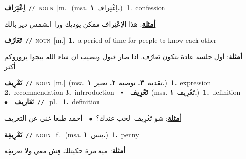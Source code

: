 \documentclass[10pt,a4paper,twoside]{article} %
\begin{document}
\begin{multicols}{2}
{\setlength\topsep{0pt}\textbf{\foreignlanguage{arabic}{اِعْتِرَاف}}\ {\color{gray}\texttt{//}\color{black}}\ \textsc{noun}\ [m.]\ \color{gray}(msa. \foreignlanguage{arabic}{اِعْتِراف}~\foreignlanguage{arabic}{\textbf{١.}})\color{black}\ \textbf{1.}~confession\  \begin{flushright}\color{gray}\foreignlanguage{arabic}{\textbf{\underline{\foreignlanguage{arabic}{أمثلة}}}: هذا الاِعْتِراف ممكن يوديك ورا الشمس دير بالك}\end{flushright}\color{black}} \vspace{2mm}

{\setlength\topsep{0pt}\textbf{\foreignlanguage{arabic}{تَعَارُف}}\ {\color{gray}\texttt{//}\color{black}}\ \textsc{noun}\ [m.]\ \textbf{1.}~a period of time for people to know each other\  \begin{flushright}\color{gray}\foreignlanguage{arabic}{\textbf{\underline{\foreignlanguage{arabic}{أمثلة}}}: أول جلسة عادة بتكون تَعارُف. اذا صار قبول ونصيب ان شاء الله بيجوا يزوروكم أكثر}\end{flushright}\color{black}} \vspace{2mm}

{\setlength\topsep{0pt}\textbf{\foreignlanguage{arabic}{تَعْرِيف}}\ {\color{gray}\texttt{//}\color{black}}\ \textsc{noun}\ [m.]\ \color{gray}(msa. \foreignlanguage{arabic}{تقديم}~\foreignlanguage{arabic}{\textbf{٣.}}  \foreignlanguage{arabic}{توصية}~\foreignlanguage{arabic}{\textbf{٢.}}  \foreignlanguage{arabic}{تعبير}~\foreignlanguage{arabic}{\textbf{١.}})\color{black}\ \textbf{1.}~expression  \textbf{2.}~recommendation  \textbf{3.}~intrroduction\ \ $\smblkdiamond$\ \ \setlength\topsep{0pt}\textbf{\foreignlanguage{arabic}{تَعْرِيف}}\ \color{gray}(msa. \foreignlanguage{arabic}{تَعْرِيف}~\foreignlanguage{arabic}{\textbf{١.}})\color{black}\ \textbf{1.}~definition\ \ $\bullet$\ \ \setlength\topsep{0pt}\textbf{\foreignlanguage{arabic}{تَعَارِيف}}\ {\color{gray}\texttt{//}\color{black}}\ [pl.]\ \textbf{1.}~definition\  \begin{flushright}\color{gray}\foreignlanguage{arabic}{\textbf{\underline{\foreignlanguage{arabic}{أمثلة}}}: شو تَعْرِيف الحب عندك؟\ $\bullet$\ \  أحمد طبعا غني عن التعريف}\end{flushright}\color{black}} \vspace{2mm}

{\setlength\topsep{0pt}\textbf{\foreignlanguage{arabic}{تَعْرِيفِة}}\ {\color{gray}\texttt{//}\color{black}}\ \textsc{noun}\ [f.]\ \color{gray}(msa. \foreignlanguage{arabic}{بنس}~\foreignlanguage{arabic}{\textbf{١.}})\color{black}\ \textbf{1.}~penny\  \begin{flushright}\color{gray}\foreignlanguage{arabic}{\textbf{\underline{\foreignlanguage{arabic}{أمثلة}}}: مية مرة حكيتلك فِش معي ولا تعريفِة}\end{flushright}\color{black}} \vspace{2mm}


\end{multicols}
\end{document}
